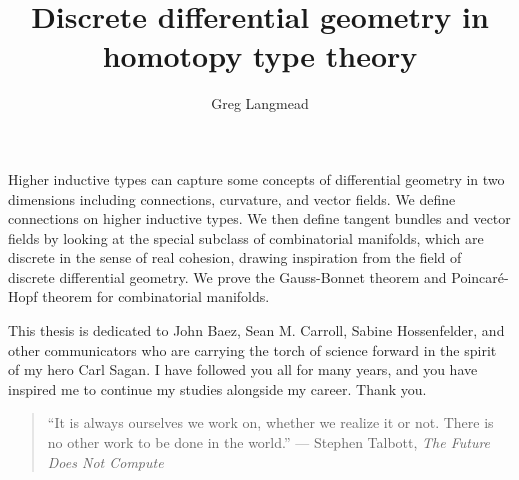 \documentclass[12pt,fleqn]{article}
\title{Discrete differential geometry in homotopy type theory}
\author{Greg Langmead}
\renewenvironment{abstract}{\section*{\abstractname}}{}
\begin{document}
\maketitle

\begin{abstract}
Higher inductive types can capture some concepts of differential geometry in two dimensions including connections, curvature, and vector fields. We define connections on higher inductive types. We then define tangent bundles and vector fields by looking at the special subclass of combinatorial manifolds, which are discrete in the sense of real cohesion\cite{shulman_cohesion}, drawing inspiration from the field of discrete differential geometry. We prove the Gauss-Bonnet theorem and Poincaré-Hopf theorem for combinatorial manifolds.
\end{abstract}

\begin{dedication}
This thesis is dedicated to John Baez, Sean M. Carroll, Sabine Hossenfelder, and other communicators who are carrying the torch of science forward in the spirit of my hero Carl Sagan. I have followed you all for many years, and you have inspired me to continue my studies alongside my career. Thank you.

\begin{quote} 
\centering
``It is always ourselves we work on, whether we realize it or not. There is no other work to be done in the world.'' --- Stephen Talbott, \emph{The Future Does Not Compute}\cite{talbott}
\end{quote}
\end{dedication}

\listofchanges[title=Changelist]
\listoftodos
\clearpage


\tableofcontents 
\clearpage

\clearpage

\clearpage

\clearpage

\clearpage

\clearpage

\clearpage
% 


\end{document}
